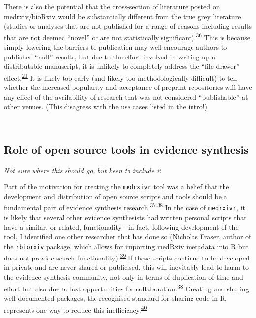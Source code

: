 \documentclass[a4paper, twoside]{templates/ociamthesis}
\begin{document}
There is also the potential that the cross-section of literature posted on medrxiv/bioRxiv would be substantially different from the true grey literature (studies or analyses that are not published for a range of reasons including results that are not deemed ``novel'' or are not statistically significant).\textsuperscript{\protect\hyperlink{ref-song2010}{36}} This is because simply lowering the barriers to publication may well encourage authors to published ``null'' results, but due to the effort involved in writing up a distributable manuscript, it is unlikely to completely address the ``file drawer'' effect.\textsuperscript{\protect\hyperlink{ref-rosenthal1979}{21}} It is likely too early (and likely too methodologically difficult) to tell whether the increased popularity and acceptance of preprint repositories will have any effect of the availability of research that was not considered ``publishable'' at other venues. (This disagress with the use cases listed in the intro!)

~

\hypertarget{role-of-open-source-tools-in-evidence-synthesis}{%
\subsection{Role of open source tools in evidence synthesis}\label{role-of-open-source-tools-in-evidence-synthesis}}

\emph{Not sure where this should go, but keen to include it}

Part of the motivation for creating the \texttt{medrxivr} tool was a belief that the development and distribution of open source scripts and tools should be a fundamental part of evidence synthesis research.\textsuperscript{\protect\hyperlink{ref-goldacre2019b}{37},\protect\hyperlink{ref-mckiernan2016c}{38}} In the case of \texttt{medrxivr}, it is likely that several other evidence synthesists had written personal scripts that have a similar, or related, functionality - in fact, following development of the tool, I identified one other researcher that has done so (Nicholas Fraser, author of the \texttt{rbiorxiv} package, which allows for importing medRxiv metadata into R but does not provide search functionality).\textsuperscript{\protect\hyperlink{ref-rbiorxiv}{39}} If these scripts continue to be developed in private and are never shared or publicised, this will inevitably lead to harm to the evidence synthesis community, not only in terms of duplication of time and effort but also due to lost opportunities for collaboration.\textsuperscript{\protect\hyperlink{ref-mckiernan2016c}{38}} Creating and sharing well-documented packages, the recognised standard for sharing code in R, represents one way to reduce this inefficiency.\textsuperscript{\protect\hyperlink{ref-vuorre2020}{40}}
\end{document}
